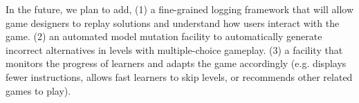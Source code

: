 \documentclass[conference]{IEEEtran}
\begin{document}
In the future, we plan to add, (1) a fine-grained logging framework that will allow game designers to replay solutions and understand how users interact with the game. (2) an automated model mutation facility to automatically generate incorrect alternatives in levels with multiple-choice gameplay. (3) a facility that monitors the progress of learners and adapts the game accordingly (e.g. displays fewer instructions, allows fast learners to skip levels, or recommends other related games to play).

%
%



%
%
\end{document}

